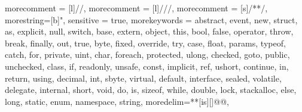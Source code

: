 

\newcommand{\tp}{workshop}
\newcommand{\Tp}{Workshop}


{ morecomment = [l]{//}, 
morecomment = [l]{///},
morecomment = [s]{/*}{*/},
morestring=[b]",
 sensitive = true,
morekeywords = 
{abstract,  event,  new,  struct,
as,  explicit,  null,  switch,   base, 
extern,  object,  this,   bool,  false, 
operator,  throw,   break,  finally,  out, 
true,   byte,  fixed,  override,  try,   case,
 float,  params,  typeof,   catch,  for,  private, 
uint,   char,  foreach,  protected,  ulong,
 checked,  goto,  public,  unchecked,   class, 
if,  readonly,  unsafe,   const,  implicit,  ref,
 ushort,   continue,  in,  return,  using,   decimal,
 int,  sbyte,  virtual,   default,  interface,  sealed, 
volatile,   delegate,  internal,  short,  void,   do, 
is,  sizeof,  while,   double,  lock,  stackalloc, 
 else,  long,  static,      enum,  namespace,  string},
moredelim=**[is][\only<+>{\color{red}}]{@}{@},
}

